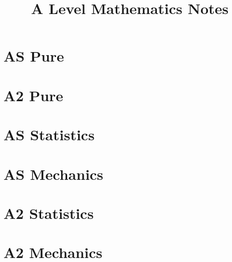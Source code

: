 \documentclass[oneside,fleqn,11pt]{book}
\title{A Level Mathematics Notes}
\begin{document}
\everymath{\displaystyle}
\maketitle
\tableofcontents

\part{AS Pure}
\setcounter{chapter}{0}


\part{A2 Pure}
\setcounter{chapter}{0}


\part{AS Statistics}
\setcounter{chapter}{0}


\part{AS Mechanics}
\setcounter{chapter}{7}


\part{A2 Statistics}
\setcounter{chapter}{0}


\part{A2 Mechanics}
\setcounter{chapter}{3}

\end{document}
